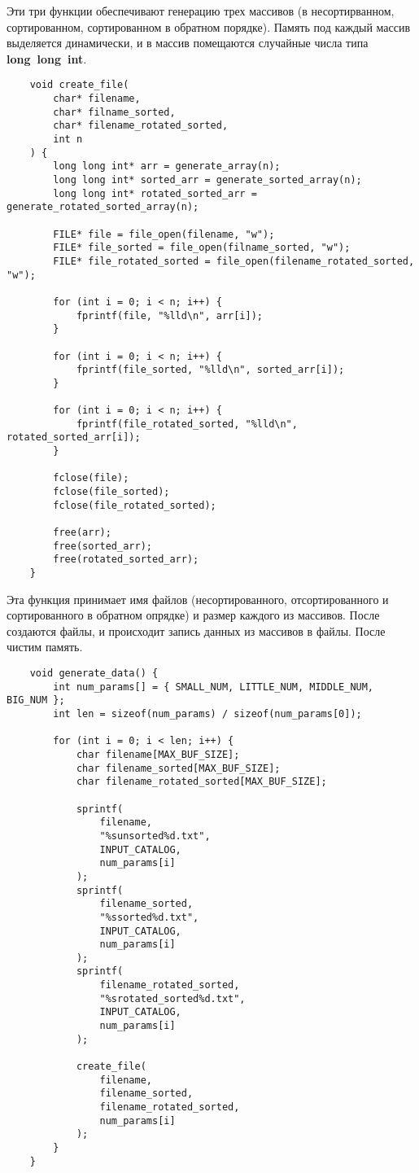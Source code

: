 \documentclass[a4paper,12pt,titlepage,finall]{article}
\begin{document}
Эти три функции обеспечивают генерацию трех массивов (в несортирванном, сортированном, сортированном в обратном порядке).
Память под каждый массив выделяется динамически, и в массив помещаются случайные числа типа \textbf{long~long~int}.

\begin{verbatim}
    void create_file(
        char* filename,
        char* filname_sorted,
        char* filename_rotated_sorted,
        int n
    ) {
        long long int* arr = generate_array(n);
        long long int* sorted_arr = generate_sorted_array(n);
        long long int* rotated_sorted_arr = generate_rotated_sorted_array(n);

        FILE* file = file_open(filename, "w");
        FILE* file_sorted = file_open(filname_sorted, "w");
        FILE* file_rotated_sorted = file_open(filename_rotated_sorted, "w");

        for (int i = 0; i < n; i++) {
            fprintf(file, "%lld\n", arr[i]);
        }

        for (int i = 0; i < n; i++) {
            fprintf(file_sorted, "%lld\n", sorted_arr[i]);
        }

        for (int i = 0; i < n; i++) {
            fprintf(file_rotated_sorted, "%lld\n", rotated_sorted_arr[i]);
        }

        fclose(file);
        fclose(file_sorted);
        fclose(file_rotated_sorted);

        free(arr);
        free(sorted_arr);
        free(rotated_sorted_arr);
    }
\end{verbatim}

Эта функция принимает имя файлов (несортированного, отсортированного и сортированного в обратном опрядке) и размер каждого из массивов.
После создаются файлы, и происходит запись данных из массивов в файлы. После чистим память.

\begin{verbatim}
    void generate_data() {
        int num_params[] = { SMALL_NUM, LITTLE_NUM, MIDDLE_NUM, BIG_NUM };
        int len = sizeof(num_params) / sizeof(num_params[0]);

        for (int i = 0; i < len; i++) {
            char filename[MAX_BUF_SIZE];
            char filename_sorted[MAX_BUF_SIZE];
            char filename_rotated_sorted[MAX_BUF_SIZE];

            sprintf(
                filename,
                "%sunsorted%d.txt",
                INPUT_CATALOG,
                num_params[i]
            );
            sprintf(
                filename_sorted,
                "%ssorted%d.txt",
                INPUT_CATALOG,
                num_params[i]
            );
            sprintf(
                filename_rotated_sorted,
                "%srotated_sorted%d.txt",
                INPUT_CATALOG,
                num_params[i]
            );

            create_file(
                filename,
                filename_sorted,
                filename_rotated_sorted,
                num_params[i]
            );
        }
    }
\end{verbatim}
\end{document}
